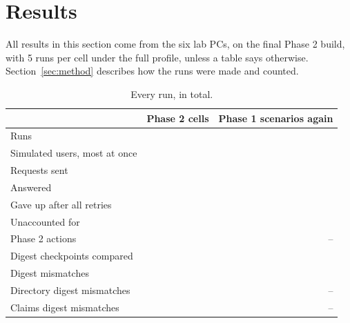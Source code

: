 \section{Results}
\label{sec:results}

All results in this section come from the six lab PCs, on the final Phase 2 build, with 5 runs per cell under the full profile, unless a table says otherwise. Section~\ref{sec:method} describes how the runs were made and counted.

\begin{table}[!htb]
\centering\small
\caption{Every run, in total.}
\label{tab:totals}
\begin{tabular}{@{}lrr@{}}
\toprule
 & Phase 2 cells & Phase 1 scenarios again \\
\midrule
Runs & \tbd{} & \tbd{} \\
Simulated users, most at once & \tbd{} & \tbd{} \\
Requests sent & \tbd{} & \tbd{} \\
Answered & \tbd{} & \tbd{} \\
Gave up after all retries & \tbd{} & \tbd{} \\
Unaccounted for & \tbd{} & \tbd{} \\
Phase 2 actions & \tbd{} & -- \\
Digest checkpoints compared & \tbd{} & \tbd{} \\
Digest mismatches & \tbd{} & \tbd{} \\
Directory digest mismatches & \tbd{} & -- \\
Claims digest mismatches & \tbd{} & -- \\
\bottomrule
\end{tabular}
\end{table}

